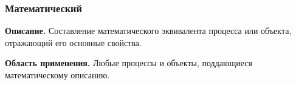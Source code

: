 









\subsubsection*{\textbf{Математический}}
\textbf{Описание.} Составление математического эквивалента процесса или объекта, отражающий его основные свойства.

\textbf{Область применения.} Любые процессы и объекты, поддающиеся математическому описанию.

